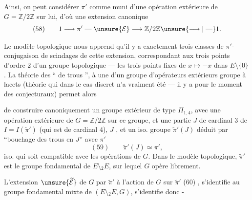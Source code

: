 Ainsi, on peut considérer $\pi'$ comme muni 
d'une  opération extérieure de
$G=\mathbb Z/2\mathbb Z$ sur lui, d'où une extension
canonique
\[
(58)\qquad 1\longrightarrow\pi'\mathrel{\text{---}}\unsure{\mathcal E}\longrightarrow\mathbb Z/2\mathbb Z\unsure{\longrightarrow|\mathrel{\text{---}}}1.
\]

Le modèle topologique nous apprend
qu'il y a exactement trois classes de $\pi'$-
conjugaison de scindages de cette
extension, correspondant aux trois
points d'ordre $2$ d'un groupe topologique
 --- les trois points fixes de
$x\mapsto-x$ dans $E\setminus\{0\}$. La théorie des
`` de trous '',  à une
 d'un groupe  d'opérateurs extérieurs
 groupe à lacets (théorie qui
 dans le cas discret n'a vraiment
été  --- il y a pour le moment des
 conjecturaux) permet alors


de construire canoniquement un groupe extérieur  de type $\Pi_{1,4}$, avec une opération extérieure de $G=\mathbb Z/2\mathbb Z$ sur ce groupe, et une partie $J$  de cardinal $3$ de $I=I(\widetilde{\pi}')$ (qui est de cardinal $4$), $J$ , et un iso.  groupe $\widetilde{\pi}'(J)$  déduit par ``bouchage des trous en $J$'' avec $\pi'$
\[
(59)\qquad \widetilde{\pi}'(J)\simeq\pi',
\]
iso. qui soit compatible avec les opérations de $G$. Dans le modèle topologique, $\widetilde{\pi}'$ est le groupe fondamental  de  $E\setminus {}_2E$,  sur lequel $G$ opère librement.


L'extension $\unsure{\widetilde{\mathcal E}}$ de $G$ par $\widetilde{\pi}'$  à l'action de  $G$ sur $\widetilde{\pi}'$
\noindent (60)\quad
{},
 s'identifie  au groupe fondamental mixte de $(E\setminus {}_2E,G)$, s'identifie donc -

